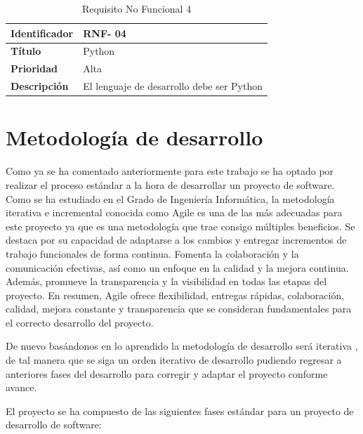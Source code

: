 \begin{table}[H] 
\begin{center}
\begin{tabular} {|P{4cm}|P{10cm}|}\hline
   {\bf Identificador} &{\bf RNF- 04}\\ \hline
  \textbf{Título}& Python\\ \hline
  \textbf{Prioridad}&  Alta\\ \hline
  \textbf{Descripción}& El lenguaje de desarrollo debe ser Python\\ \hline
\end{tabular}
\end{center}
\vspace{-0.6cm}
\caption{Requisito No Funcional 4}
\end{table}


\section{Metodología de desarrollo}

Como ya se ha comentado anteriormente para este trabajo se ha optado por realizar el proceso estándar a la hora de desarrollar un proyecto de software. Como se ha estudiado en el Grado de Ingeniería Informática, la metodología iterativa e incremental conocida como Agile \cite{luna2019usabilidad} es una de las más adecuadas para este proyecto ya que es una metodología que trae consigo múltiples beneficios. Se destaca por su capacidad de adaptarse a los cambios y entregar incrementos de trabajo funcionales de forma continua. Fomenta la colaboración y la comunicación efectivas, así como un enfoque en la calidad y la mejora continua. Además, promueve la transparencia y la visibilidad en todas las etapas del proyecto. En resumen, Agile ofrece flexibilidad, entregas rápidas, colaboración, calidad, mejora constante y transparencia \cite{luna2019usabilidad} que se consideran fundamentales para el correcto desarrollo del proyecto.

De nuevo basándonos en lo aprendido la metodología de desarrollo será iterativa \cite{gutierrez2011metodos}, de tal manera que se siga un orden iterativo de desarrollo pudiendo regresar a anteriores fases del desarrollo para corregir y adaptar el proyecto conforme avance.

El proyecto se ha compuesto de las siguientes fases estándar para un proyecto de desarrollo de software:

